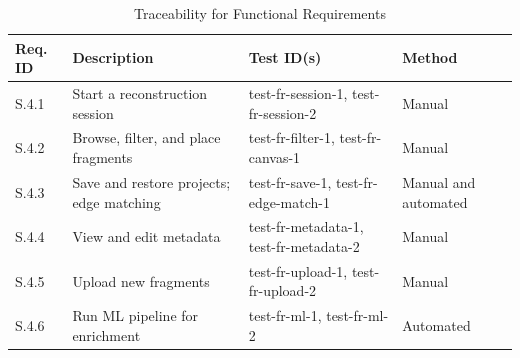 \documentclass[12pt, titlepage]{article}
\begin{document}
\begin{table}[ht]
    \centering
    \begin{tabular}{|p{2cm}|p{4cm}|p{4cm}|p{2.5cm}|}
        \hline
        \textbf{Req. ID} & \textbf{Description} & \textbf{Test ID(s)} & \textbf{Method} \\
        \hline
        S.4.1 & Start a reconstruction session & test-fr-session-1, test-fr-session-2 & Manual \\
        \hline
        S.4.2 & Browse, filter, and place fragments & test-fr-filter-1, test-fr-canvas-1 & Manual \\
        \hline
        S.4.3 & Save and restore projects; edge matching & test-fr-save-1, test-fr-edge-match-1 & Manual and automated \\
        \hline
        S.4.4 & View and edit metadata & test-fr-metadata-1, test-fr-metadata-2 & Manual \\
        \hline
        S.4.5 & Upload new fragments & test-fr-upload-1, test-fr-upload-2 & Manual \\
        \hline
        S.4.6 & Run ML pipeline for enrichment & test-fr-ml-1, test-fr-ml-2 & Automated \\
        \hline
    \end{tabular}
    \caption{Traceability for Functional Requirements}
\end{table}
\end{document}
